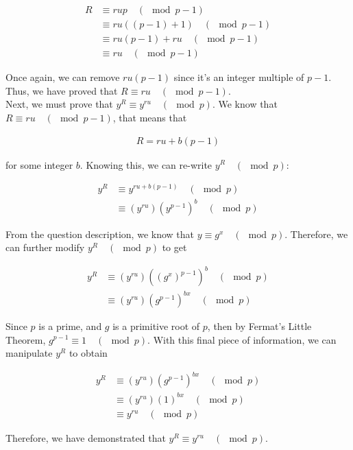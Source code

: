 \documentclass[11pt]{article}
\theoremstyle{definition}
\begin{document}
\begin{enumerate}
\begin{enumerate}
\begin{align*}
    R &\equiv rup \quad (\mod{p - 1}) \\
    &\equiv ru((p - 1) + 1) \quad (\mod{p - 1}) \\
    &\equiv ru(p - 1) + ru \quad (\mod{p - 1}) \\
    &\equiv ru \quad (\mod{p - 1})
\end{align*}

Once again, we can remove $ru(p - 1)$ since it's an integer multiple of $p - 1$. Thus, we have proved that $R \equiv ru \quad (\mod{p - 1})$. \\

Next, we must prove that $y^R \equiv y^{ru} \quad (\mod{p})$. We know that $R \equiv ru \quad (\mod{p - 1})$, that means that

\begin{align*}
    R = ru + b(p - 1)
\end{align*}

for some integer $b$. Knowing this, we can re-write $y^R \quad (\mod{p})$:

\begin{align*}
    y^R &\equiv y^{ru + b(p - 1)} \quad (\mod{p}) \\
    &\equiv (y^{ru}) (y^{p - 1})^b \quad (\mod{p})
\end{align*}

From the question description, we know that $y \equiv g^x \quad (\mod{p})$. Therefore, we can further modify $y^R \quad (\mod{p})$ to get

\begin{align*}
    y^R &\equiv (y^{ru}) ((g^x)^{p - 1})^b \quad (\mod{p}) \\
    &\equiv (y^{ru}) (g^{p - 1})^{bx} \quad (\mod{p})
\end{align*}

Since $p$ is a prime, and $g$ is a primitive root of $p$, then by Fermat's Little Theorem, $g^{p - 1} \equiv 1 \quad (\mod{p})$. With this final piece of information, we can manipulate $y^R$ to obtain

\begin{align*}
    y^R &\equiv (y^{ru}) (g^{p - 1})^{bx} \quad (\mod{p}) \\
    &\equiv (y^{ru}) (1)^{bx} \quad (\mod{p}) \\
    &\equiv y^{ru} \quad (\mod{p})
\end{align*}

Therefore, we have demonstrated that $y^R \equiv y^{ru} \quad (\mod{p})$.
\\


\end{enumerate}
\end{enumerate}
\end{document}
